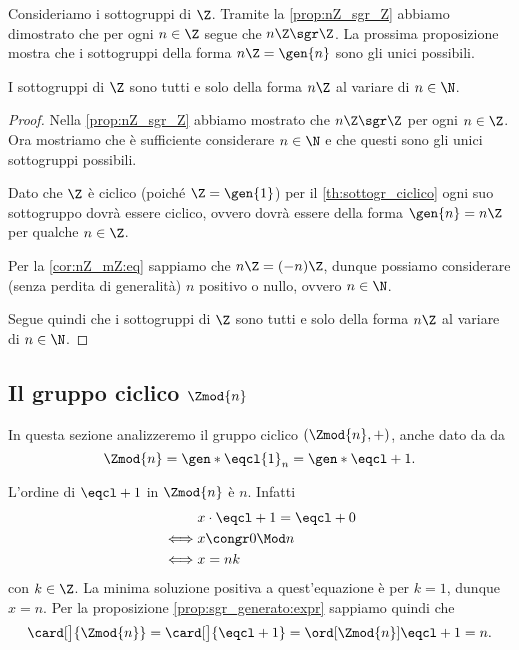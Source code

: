 Consideriamo i sottogruppi di $\Z$. Tramite la \autoref{prop:nZ_sgr_Z} abbiamo dimostrato che per ogni $n \in \Z$ segue che $n\Z \sgr \Z$. La prossima proposizione mostra che i sottogruppi della forma $n\Z = \gen{n}$ sono gli unici possibili.

\begin{proposition}
    \label{prop:sgr_Z}
    I sottogruppi di $\Z$ sono tutti e solo della forma $n\Z$ al variare di $n \in \N$.
\end{proposition}
\begin{proof}
    Nella \autoref{prop:nZ_sgr_Z} abbiamo mostrato che $n\Z \sgr \Z$ per ogni $n \in \Z$. Ora mostriamo che è sufficiente considerare $n \in \N$ e che questi sono gli unici sottogruppi possibili.

    Dato che $\Z$ è ciclico (poiché $\Z = \gen{1}$) per il \autoref{th:sottogr_ciclico} ogni suo sottogruppo dovrà essere ciclico, ovvero dovrà essere della forma $\gen{n} = n\Z$ per qualche $n \in \Z$.

    Per la \autoref{cor:nZ_mZ:eq} sappiamo che $n\Z = (-n)\Z$, dunque possiamo considerare (senza perdita di generalità) $n$ positivo o nullo, ovvero $n \in \N$.

    Segue quindi che i sottogruppi di $\Z$ sono tutti e solo della forma $n\Z$ al variare di $n \in \N$.
\end{proof}


\subsection{Il gruppo ciclico $\Zmod{n}$}

In questa sezione analizzeremo il gruppo ciclico $(\Zmod{n}, +)$, anche dato da da \[
    \Zmod{n} = \gen*{\eqcl{1}_{n}} = \gen*{\eqcl+ 1}.
\]

L'ordine di $\eqcl+ 1$ in $\Zmod{n}$ è $n$. Infatti \begin{align*}
    &x\cdot \eqcl+ 1 = \eqcl+ 0\\
    \iff &x \congr 0 \Mod n \\
    \iff &x = nk
\end{align*}
con $k \in \Z$. 
La minima soluzione positiva a quest'equazione è per $k = 1$, dunque $x = n$. 
Per la proposizione \ref{prop:sgr_generato:expr} sappiamo quindi che \begin{equation} \label{eq:card_Z/nZ}
    \card[\big]{\Zmod{n}} = \card[\big]{\eqcl+ 1} = \ord[\Zmod{n}]{\eqcl+ 1} = n.
\end{equation}

